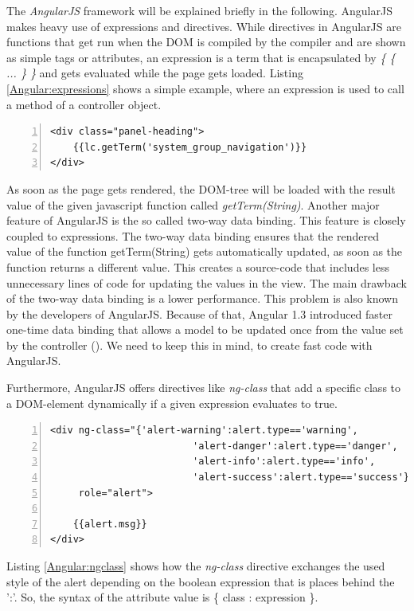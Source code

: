 The \textit{AngularJS} framework will be explained briefly in the following. AngularJS makes heavy use of expressions and directives.
While directives in AngularJS are functions that get run when the DOM is compiled by the compiler and are shown as simple tags or attributes, an expression is a term that is encapsulated by \textit{\{ \{ ... \} \}} and gets evaluated while the page gets loaded. Listing \ref{Angular:expressions} shows a simple example, where an expression is used to call a method of a controller object.

\begin{lstlisting}[numbers=left,caption={Simple example that shows the use of expressions.},label=Angular:expressions,frame=tlbr,breaklines]
<div class="panel-heading"> 
	{{lc.getTerm('system_group_navigation')}} 
</div>
\end{lstlisting}

As soon as the page gets rendered, the \ac{DOM}-tree will be loaded with the result value of the given javascript function called \textit{getTerm(String)}. 
Another major feature of AngularJS is the so called two-way data binding. This feature is closely coupled to expressions. The two-way data binding ensures that the rendered value of the function getTerm(String) gets automatically updated, as soon as the function returns a different value. This creates a source-code that includes less unnecessary lines of code for updating the values in the view. The main drawback of the two-way data binding is a lower performance. This problem is also known by the developers of AngularJS. Because of that, Angular 1.3 introduced faster one-time data binding that allows a model to be updated once from the value set by the controller (\cite{Peterson:2015aa}). We need to keep this in mind, to create fast code with AngularJS.

Furthermore, AngularJS offers directives like \textit{ng-class} that add a specific class to a \ac{DOM}-element dynamically if a given expression evaluates to true.

\begin{lstlisting}[numbers=left,caption={Simple example that shows the ng-class directive to change the style respectivly color of an alert depending on its type.},label=Angular:ngclass,frame=tlbr,breaklines]
<div ng-class="{'alert-warning':alert.type=='warning',
                         'alert-danger':alert.type=='danger',
                         'alert-info':alert.type=='info',
                         'alert-success':alert.type=='success'}"
     role="alert">

	{{alert.msg}}
</div>
\end{lstlisting}
Listing \ref{Angular:ngclass} shows how the \textit{ng-class} directive exchanges the used style of the alert depending on the boolean expression that is places behind the ':'. So, the syntax of the attribute value is \{ class : expression \}.

